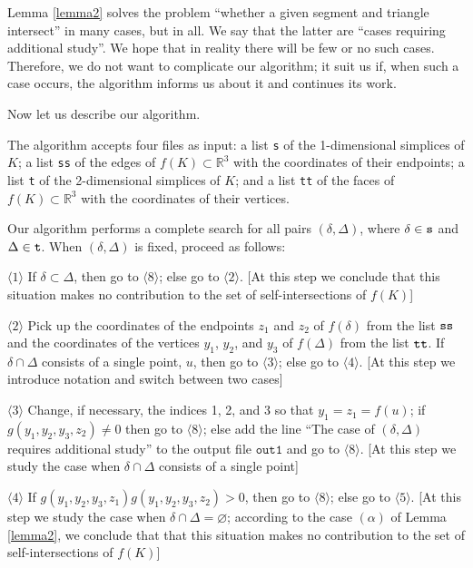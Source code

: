 \documentclass[12pt, reqno]{amsart}
\begin{document}
Lemma \ref{lemma2} solves the problem ``whether a given segment 
and triangle intersect'' in many cases, but in all.
We say that the latter are ``cases requiring additional study''.
We hope that in reality there will be few or no such cases.
Therefore, we do not want to complicate our algorithm; it suit us if, when 
such a case occurs, the algorithm informs us about it and continues its work.

Now let us describe our algorithm.

The algorithm accepts four files as input: 
a list \texttt{s} of the 1-dimensional simplices of 
$K$; 
a list \texttt{ss} of the edges of 
$f(K)\subset\mathbb{R}^3$
with the coordinates of their endpoints; 
a list \texttt{t} of the 2-dimensional simplices of 
$K$; 
and a list \texttt{tt} of the faces of 
$f(K)\subset\mathbb{R}^3$
with the coordinates of their vertices. 

Our algorithm performs a complete search for all pairs 
$(\delta, \Delta)$, 
where 
$\delta\in\tt{s}$
and 
$\Delta\in\tt{t}$.
When 
$(\delta, \Delta)$
is fixed, proceed as follows: 

$\langle 1\rangle$ 
If 
$\delta\subset \Delta$, 
then go to 
$\langle 8\rangle$; 
else go to 
$\langle 2\rangle$.
[At this step we conclude that this situation makes no contribution to the set of 
self-intersections of
$f(K)$]

$\langle 2\rangle$ 
Pick up the coordinates of the endpoints 
$z_1$
and 
$z_2$ 
of 
$f(\delta)$
from the list 
$\tt{ss}$
and the coordinates of the vertices 
$y_1$, $y_2$,
and 
$y_3$ 
of 
$f(\Delta)$
from the list 
$\tt{tt}$.
If 
$\delta\cap \Delta$
consists of a single point, 
$u$, 
then go to 
$\langle 3\rangle$; 
else go to 
$\langle 4\rangle$.
[At this step we introduce notation and switch between two cases]

$\langle 3\rangle$ 
Change, if necessary, the indices 1, 2, and 3 so that 
$y_1=z_1=f(u)$;
if 
$g(y_1,y_2,y_3,z_2)\neq 0$ 
then go to 
$\langle 8\rangle$;
else add the line ``The case of $(\delta, \Delta)$ requires additional study''
to the output file 
$\texttt{out1}$
and go to 
$\langle 8\rangle$.
[At this step we study the case when 
$\delta\cap \Delta$
consists of a single point]

$\langle 4\rangle$
If
$g(y_1, y_2, y_3, z_1)g(y_1, y_2, y_3, z_2)>0$,
then go to 
$\langle 8\rangle$; 
else go to 
$\langle 5\rangle$.
[At this step we study the case when
$\delta\cap \Delta=\varnothing$; 
according to the case 
$(\alpha)$ 
of Lemma \ref{lemma2},
we conclude that that this situation makes no contribution to the set of 
self-intersections of
$f(K)$]
\end{document}
